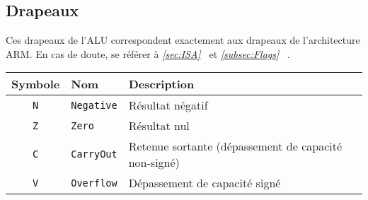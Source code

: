 \documentclass{article}
\begin{document}
    \subsection{Drapeaux}

    Ces drapeaux de l'ALU correspondent exactement aux drapeaux de l'architecture ARM. En cas de doute, se référer à \textit{\ref{sec:ISA}~} et \textit{\ref{subsec:Flags}~} .

    \begin{tabular}{|c|l|l|}
        \hline
        \textbf{Symbole} & \textbf{Nom}       & \textbf{Description}                                 \\
        \hline

        \texttt{N}      & \texttt{Negative} & Résultat négatif                                     \\
        \hline
        \texttt{Z}      & \texttt{Zero}    & Résultat nul                                         \\
        \hline
        \texttt{C}      & \texttt{CarryOut} & Retenue sortante (dépassement de capacité non-signé) \\
        \hline
        \texttt{V}      & \texttt{Overflow} & Dépassement de capacité signé                        \\

        \hline
    \end{tabular}
\end{document}
